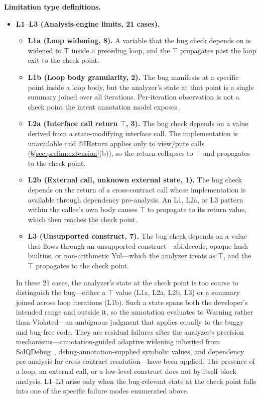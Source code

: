 \documentclass[pdflatex,sn-basic]{sn-jnl}%
\theoremstyle{thmstyleone}%
\theoremstyle{thmstyletwo}%
\theoremstyle{thmstylethree}%
\begin{document}
\smallskip
\noindent\textbf{Limitation type definitions.}
\begin{itemize}
  \item \textbf{L1--L3 (Analysis-engine limits, 21 cases).}
  \begin{itemize}
    \item \textbf{L1a (Loop widening, 8).} A variable that the bug check depends on is widened to $\top$ inside a preceding loop, and the $\top$ propagates past the loop exit to the check point.
    \item \textbf{L1b (Loop body granularity, 2).} The bug manifests at a specific point inside a loop body, but the analyzer's state at that point is a single summary joined over all iterations. Per-iteration observation is not a check point the intent annotation model exposes.
    \item \textbf{L2a (Interface call return $\top$, 3).} The bug check depends on a value derived from a state-modifying interface call. The implementation is unavailable and @IReturn applies only to view/pure calls (§\ref{sec:prelim:extension}(b)), so the return collapses to $\top$ and propagates to the check point.
    \item \textbf{L2b (External call, unknown external state, 1).} The bug check depends on the return of a cross-contract call whose implementation is available through dependency pre-analysis. An L1, L2a, or L3 pattern within the callee's own body causes $\top$ to propagate to its return value, which then reaches the check point.
    \item \textbf{L3 (Unsupported construct, 7).} The bug check depends on a value that flows through an unsupported construct---abi.decode, opaque hash builtins, or non-arithmetic Yul---which the analyzer treats as $\top$, and the $\top$ propagates to the check point.
  \end{itemize}
  \noindent In these 21 cases, the analyzer's state at the check point is too coarse to distinguish the bug---either a $\top$ value (L1a, L2a, L2b, L3) or a summary joined across loop iterations (L1b). Such a state spans both the developer's intended range and outside it, so the annotation evaluates to Warning rather than Violated---an ambiguous judgment that applies equally to the buggy and bug-free code. They are residual failures after the analyzer's precision mechanisms---annotation-guided adaptive widening inherited from SolQDebug~\citep{solqdebug}, debug-annotation-supplied symbolic values, and dependency pre-analysis for cross-contract resolution---have been applied. The presence of a loop, an external call, or a low-level construct does not by itself block analysis. L1--L3 arise only when the bug-relevant state at the check point falls into one of the specific failure modes enumerated above.


\end{itemize}
\end{document}
